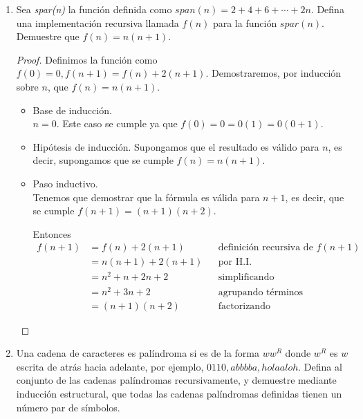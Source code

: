 \documentclass[letterpaper,11pt]{article}
\begin{document}
\begin{enumerate}
    \item Sea \textit{spar(n)} la función definida como $span(n) = 2 + 4 + 6 +
    ⋯ + 2n$. Defina una implementación recursiva llamada $f(n)$ para la función 
    $spar(n)$. Demuestre que $f(n) = n(n + 1)$.

    \begin{proof}
        Definimos la función como $f(0) = 0, f(n+1) = f(n) + 2(n+1)$. 
        Demostraremos, por inducción sobre $n$, que $f(n) = n(n + 1)$.

        \begin{itemize}
            \item Base de inducción. \\ 
            $n = 0$. Este caso se cumple ya que $f(0) = 0 = 0(1) =0(0 + 1)$.

            \item Hipótesis de inducción. Supongamos que el resultado es válido
            para $n$, es decir, supongamos que se cumple $f(n) = n(n + 1)$.

            \item Paso inductivo. \\ 
            Tenemos que demostrar que la fórmula es válida para $n + 1$, es decir,
            que se cumple $f(n + 1) = (n + 1)(n + 2)$.

            Entonces 
            \begin{align*}
                f(n + 1) 
                &= f(n) + 2(n + 1)
                && \text{definición recursiva de $f(n+1)$} \\ 
                &= n(n + 1) + 2(n + 1)
                && \text{por H.I.} \\ 
                &= n^{2} + n + 2n + 2
                && \text{simplificando} \\ 
                &= n^{2} + 3n + 2
                && \text{agrupando términos semejantes} \\ 
                &= (n + 1) (n + 2)
                && \text{factorizando}
            \end{align*}
        \end{itemize}
    \end{proof}

    \item Una cadena de caracteres es palíndroma si es de la forma $ww^{R}$ 
    donde $w^{R}$ es $w$ escrita de atrás hacia adelante, por ejemplo, $0110,
    abbbba, holaaloh$. Defina al conjunto de las cadenas palíndromas 
    recursivamente, y demuestre mediante inducción estructural, que todas las 
    cadenas palíndromas definidas tienen un número par de símbolos. 


\end{enumerate}
\end{document}
